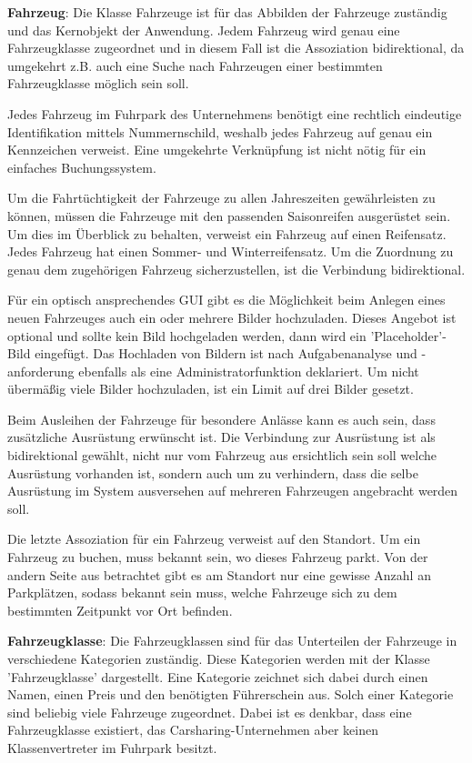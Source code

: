 \textbf{Fahrzeug}: Die Klasse Fahrzeuge ist für das Abbilden der Fahrzeuge zuständig und das Kernobjekt der Anwendung. Jedem Fahrzeug wird genau eine Fahrzeugklasse zugeordnet und in diesem Fall ist die Assoziation bidirektional, da umgekehrt z.B. auch eine Suche nach Fahrzeugen einer bestimmten Fahrzeugklasse möglich sein soll.

Jedes Fahrzeug im Fuhrpark des Unternehmens benötigt eine rechtlich eindeutige Identifikation mittels Nummernschild, weshalb jedes Fahrzeug auf genau ein Kennzeichen verweist. Eine umgekehrte Verknüpfung ist nicht nötig für ein einfaches Buchungssystem. 

Um die Fahrtüchtigkeit der Fahrzeuge zu allen Jahreszeiten gewährleisten zu können, müssen die Fahrzeuge mit den passenden Saisonreifen ausgerüstet sein. Um dies im Überblick zu behalten, verweist ein Fahrzeug auf einen Reifensatz. Jedes Fahrzeug hat einen Sommer- und Winterreifensatz. Um die Zuordnung zu genau dem zugehörigen Fahrzeug sicherzustellen, ist die Verbindung bidirektional. 

Für ein optisch ansprechendes GUI gibt es die Möglichkeit beim Anlegen eines neuen Fahrzeuges auch ein oder mehrere Bilder hochzuladen. Dieses Angebot ist optional und sollte kein Bild hochgeladen werden, dann wird ein 'Placeholder'-Bild eingefügt. Das Hochladen von Bildern ist nach Aufgabenanalyse und -anforderung ebenfalls als eine Administratorfunktion deklariert. Um nicht übermäßig viele Bilder hochzuladen, ist ein Limit auf drei Bilder gesetzt. 

Beim Ausleihen der Fahrzeuge für besondere Anlässe kann es auch sein, dass zusätzliche Ausrüstung erwünscht ist. Die Verbindung zur Ausrüstung ist als bidirektional gewählt, nicht nur vom Fahrzeug aus ersichtlich sein soll welche Ausrüstung vorhanden ist, sondern auch um zu verhindern, dass die selbe Ausrüstung im System ausversehen auf mehreren Fahrzeugen angebracht werden soll. 

Die letzte Assoziation für ein Fahrzeug verweist auf den Standort. Um ein Fahrzeug zu buchen, muss bekannt sein, wo dieses Fahrzeug parkt. Von der andern Seite aus betrachtet gibt es am Standort nur eine gewisse Anzahl an Parkplätzen, sodass bekannt sein muss, welche Fahrzeuge sich zu dem bestimmten Zeitpunkt vor Ort befinden. 

\textbf{Fahrzeugklasse}: Die Fahrzeugklassen sind für das Unterteilen der Fahrzeuge in verschiedene Kategorien zuständig. Diese Kategorien werden mit der Klasse 'Fahrzeugklasse' dargestellt. Eine Kategorie zeichnet sich dabei durch einen Namen, einen Preis und den benötigten Führerschein aus. Solch einer Kategorie sind beliebig viele Fahrzeuge zugeordnet. Dabei ist es denkbar, dass eine Fahrzeugklasse existiert, das Carsharing-Unternehmen aber keinen Klassenvertreter im Fuhrpark besitzt. 

